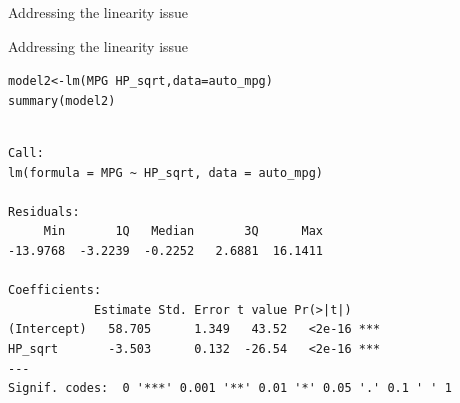 \documentclass{beamer}\usepackage[]{graphicx}\usepackage[]{color}
\makeatletter
\newcommand{\hlstr}[1]{\textcolor[rgb]{1,0.894,0.71}{#1}}%
\newcommand{\hlopt}[1]{\textcolor[rgb]{1,0.894,0.769}{#1}}%
\newcommand{\hlstd}[1]{\textcolor[rgb]{1,0.894,0.769}{#1}}%
\newcommand{\hlkwb}[1]{\textcolor[rgb]{0.804,0.776,0.451}{#1}}%
\newcommand{\hlkwc}[1]{\textcolor[rgb]{0.78,0.941,0.545}{#1}}%
\newcommand{\hlkwd}[1]{\textcolor[rgb]{1,0.78,0.769}{#1}}%
\newenvironment{kframe}{%
 \def\at@end@of@kframe{}%
 \ifinner\ifhmode%
  \def\at@end@of@kframe{\end{minipage}}%
  \begin{minipage}{\columnwidth}%
 \fi\fi%
 \def\FrameCommand##1{\hskip\@totalleftmargin \hskip-\fboxsep
 \colorbox{shadecolor}{##1}\hskip-\fboxsep
     \hskip-\linewidth \hskip-\@totalleftmargin \hskip\columnwidth}%
 \MakeFramed {\advance\hsize-\width
   \@totalleftmargin\z@ \linewidth\hsize
   \@setminipage}}%
 {\par\unskip\endMakeFramed%
 \at@end@of@kframe}
\newenvironment{knitrout}{}{} %
\makeatother
\begin{document}
\begin{darkframes}
\begin{frame}[fragile]{Addressing the linearity issue}
\begin{knitrout}
\end{knitrout}
     \end{frame}  
    
    
      
    
    
    
  
  
  
    \begin{frame}[fragile]{Addressing the linearity issue}
      \fontsize{9}{9}\selectfont
\begin{knitrout}
\begin{kframe}
\begin{alltt}
  \hlstd{model2} \hlkwb{<-} \hlkwd{lm}\hlstd{(MPG} \hlopt{~} \hlstd{HP_sqrt,} \hlkwc{data}\hlstd{=auto_mpg)}
  \hlkwd{summary}\hlstd{(model2)}
\end{alltt}
\begin{verbatim}

Call:
lm(formula = MPG ~ HP_sqrt, data = auto_mpg)

Residuals:
     Min       1Q   Median       3Q      Max 
-13.9768  -3.2239  -0.2252   2.6881  16.1411 

Coefficients:
            Estimate Std. Error t value Pr(>|t|)    
(Intercept)   58.705      1.349   43.52   <2e-16 ***
HP_sqrt       -3.503      0.132  -26.54   <2e-16 ***
---
Signif. codes:  0 '***' 0.001 '**' 0.01 '*' 0.05 '.' 0.1 ' ' 1


\end{verbatim}
\end{kframe}
\end{knitrout}
\end{frame}
\end{darkframes}
\end{document}
